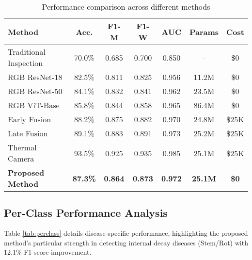 \documentclass[conference]{IEEEtran}
\begin{document}
\begin{table}[!t]
    \caption{Performance comparison across different methods}
    \label{tab:performance}
    \raggedright
    \scriptsize
    \begin{tabular}{lcccccc}
        \toprule
        \textbf{Method} & \textbf{Acc.} & \textbf{F1-M} & \textbf{F1-W} & \textbf{AUC} & \textbf{Params} & \textbf{Cost} \\
        \midrule
        Traditional Inspection & 70.0\% & 0.685 & 0.700 & 0.850 & - & \$0 \\
        RGB ResNet-18 & 82.5\% & 0.811 & 0.825 & 0.956 & 11.2M & \$0 \\
        RGB ResNet-50 & 84.1\% & 0.832 & 0.841 & 0.962 & 23.5M & \$0 \\
        RGB ViT-Base & 85.8\% & 0.844 & 0.858 & 0.965 & 86.4M & \$0 \\
        Early Fusion \cite{wang2020} & 88.2\% & 0.875 & 0.882 & 0.970 & 24.8M & \$25K \\
        Late Fusion \cite{liu2019} & 89.1\% & 0.883 & 0.891 & 0.973 & 25.2M & \$25K \\
        Thermal Camera \cite{anderson2021} & 93.5\% & 0.925 & 0.935 & 0.985 & 25.1M & \$25K \\
        \rowcolor{green!20}
        \textbf{Proposed Method} & \textbf{87.3\%} & \textbf{0.864} & \textbf{0.873} & \textbf{0.972} & \textbf{25.1M} & \textbf{\$0} \\
        \bottomrule
    \end{tabular}
\end{table}

\subsection{Per-Class Performance Analysis}

Table \ref{tab:perclass} details disease-specific performance, highlighting the proposed method's particular strength in detecting internal decay diseases (Stem/Rot) with 12.1\% F1-score improvement.
\end{document}

